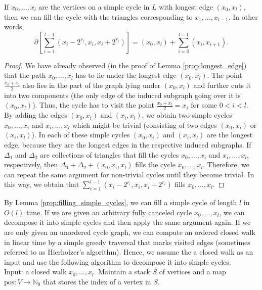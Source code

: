 %
%
\begin{lemma} \label{prop:filling_simple_cycles}
If $x_0,\ldots,x_l$ are the vertices on a simple cycle in $L$ with longest edge $(x_0,x_l)$, then we can fill the cycle with the triangles corresponding to $x_1,\ldots,x_{l-1}$. In other words,
\begin{equation*}
\partial\left[\sum _{i=1}^{l-1}(x_i-2^{r_i},x_i,x_i+2^{r_i})\right]=(x_0,x_l)+\sum_{i=0}^{l-1} (x_i,x_{i+1}).
\end{equation*}
\end{lemma}
%
\begin{proof}
We have already observed (in the proof of Lemma \ref{prop:longest_edge}) that the path $x_0,\ldots,x_l$ has to lie under the longest edge $(x_0,x_l)$. The point $\frac{x_0+x_l}{2}$ also lies in the part of the graph lying under $(x_0,x_l)$ and further cuts it into two components (the only edge of the induced subgraph going over it is $(x_0,x_l)$). Thus, the cycle has to visit the point $\frac{x_0+x_l}{2}=x_i$ for some $0<i<l$. By adding the edges $(x_0,x_i)$ and $(x_i,x_l)$, we obtain two simple cycles $x_0,\ldots,x_i$ and $x_i,\ldots,x_l$ which might be trivial (consisting of two edges $(x_0,x_i)$ or $(x_i,x_l)$). In each of these simple cycles $(x_0,x_i)$ and $(x_i,x_l)$ are the longest edge, because they are the longest edges in the respective induced subgraphs. If $\Delta_1$ and $\Delta_2$ are collections of triangles that fill the cycles $x_0,\ldots,x_i$ and $x_i,\ldots,x_l$, respectively, then $\Delta_1+\Delta_2+(x_0,x_i,x_l)$ fills the cycle $x_0,\ldots,x_l$. Therefore, we can repeat the same argument for non-trivial cycles until they become trivial. In this way, we obtain that $\sum _{i=1}^{l-1}(x_i-2^{r_i},x_i,x_i+2^{r_i})$ fills $x_0,\ldots,x_l$.
\end{proof}
%
By Lemma \ref{prop:filling_simple_cycles}, we can fill a simple cycle of length $l$ in $O(l)$ time. If we are given an arbitrary fully canceled cycle $x_0,\ldots,x_l$, we can decompose it into simple cycles and then apply the same argument again. If we are only given an unordered cycle graph, we can compute an ordered closed walk in linear time by a simple greedy traversal that marks visited edges (sometimes referred to as Hierholzer's algorithm). Hence, we assume the a closed walk as an input and use the following algorithm to decompose it into simple cycles. \\
%
Input: a closed walk $x_0,\ldots,x_l$. Maintain a stack $S$ of vertices and a map $\text{pos}\colon V\rightarrow \mathbb{N}_0$ that stores
the index of a vertex in $S$.
